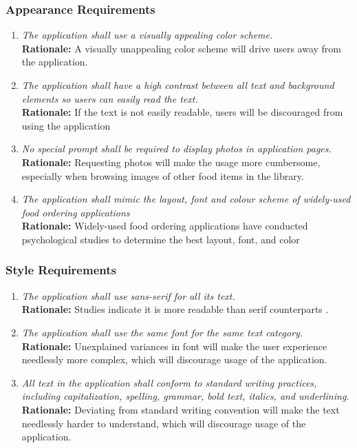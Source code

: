 \documentclass[]{article}
\begin{document}
\subsubsection{Appearance Requirements}
\label{ssub:appearance_requirements}
\begin{enumerate}[{LF-A}1. ]
    \item \textit{The application shall use a visually appealing color scheme.} \\ \textbf{Rationale:} A visually unappealing color scheme will drive users away from the application.
    \item \textit{The application shall have a high contrast between all text and background elements so users can easily read the text.} \\
    \textbf{Rationale:} If the text is not easily readable, users will be discouraged from using the application
    \item \textit{No special prompt shall be required to display photos in application pages.} \\ \textbf{Rationale:} Requesting photos will make the usage more cumbersome, especially when browsing images of other food items in the library.
	\item \textit{The application shall mimic the layout, font and colour scheme of widely-used food ordering applications} \\ \textbf{Rationale:} Widely-used food ordering applications have conducted psychological studies to determine the best layout, font, and color 
\end{enumerate}

\subsubsection{Style Requirements}
\label{ssub:style_requirements}
\begin{enumerate}[{LF-S}1. ]
    \item \textit{The application shall use sans-serif for all its text.} \\ \textbf{Rationale:} Studies indicate it is more readable than serif counterparts \cite{Adobe}.
    \item \textit{The application shall use the same font for the same text category.} \\ \textbf{Rationale:} Unexplained variances in font will make the user experience needlessly more complex, which will discourage usage of the application.
    \item \textit{All text in the application shall conform to standard writing practices, including capitalization, spelling, grammar, bold text, italics, and underlining.} \\ \textbf{Rationale:} Deviating from standard writing convention will make the text needlessly harder to understand, which will discourage usage of the application.
\end{enumerate}
\end{document}
